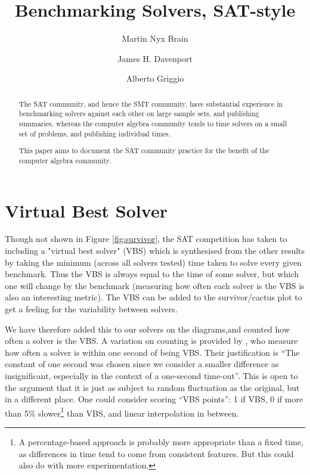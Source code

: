 \documentclass{easychair}
\begin{document}
\title{Benchmarking Solvers, SAT-style}
\author{Martin Nyx Brain \and James H. Davenport \and Alberto Griggio}
\maketitle
\begin{abstract}\noindent
The SAT community, and hence the SMT community, have substantial experience in benchmarking solvers against each other on large sample sets, and publishing summaries, whereas the computer algebra community tends to time solvers on a small set of problems, and publishing individual times.
\par
This paper aims to document the SAT community practice for the benefit of the computer algebra community.
\end{abstract}

\section{Virtual Best Solver}
Though not shown in  Figure  \ref{fig:survivor}, the SAT competition has taken to including a "virtual best solver" (VBS)
which is synthesised from the other results by taking the minimum (across all solvers tested) time taken to solve every given benchmark.
Thus the VBS is always equal to the time of some solver, but which one will change by the benchmark (measuring how often each solver is the VBS is also an interesting metric).  The VBS can be added to the survivor/cactus plot to get a feeling for the variability between solvers.
\par
We have therefore added this to our solvers on the diagrams,and counted how often a solver is the VBS. A variation on counting is provided by \cite{Janotaetal2016a}, who measure how often a solver is within one second of being VBS. Their justification is ``The constant of one second was chosen since we consider a smaller difference as insignificant, especially in the context of a one-second time-out''.
This is open to the argument that it is just as subject to random fluctuation as the original, but in a different place. One could consider scoring ``VBS points'': 1 if VBS, 0 if more than 5\% slower\footnote{A percentage-based approach is probably more appropriate than a fixed time, as differences in time tend to come from consistent features. But this could also do with more experimentation.} than VBS, and linear  interpolation in between.
\end{document}
